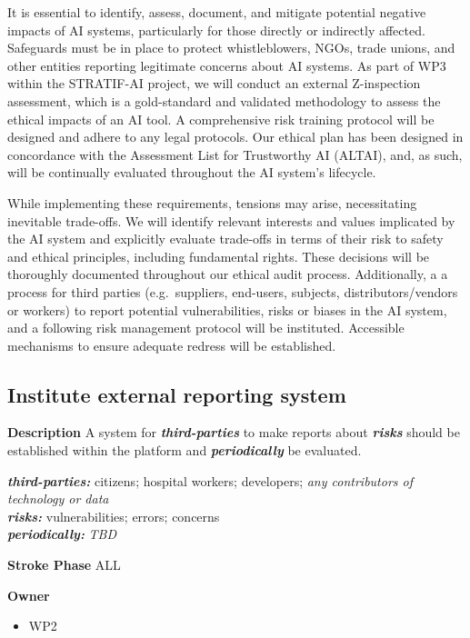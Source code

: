 \documentclass[
  letterpaper,
  DIV=11,
  numbers=noendperiod]{scrreport}
\providecommand{\tightlist}{%
  \setlength{\itemsep}{0pt}\setlength{\parskip}{0pt}}\usepackage{longtable,booktabs,array}
\begin{document}
It is essential to identify, assess, document, and mitigate potential
negative impacts of AI systems, particularly for those directly or
indirectly affected. Safeguards must be in place to protect
whistleblowers, NGOs, trade unions, and other entities reporting
legitimate concerns about AI systems. As part of WP3 within the
STRATIF-AI project, we will conduct an external Z-inspection assessment,
which is a gold-standard and validated methodology to assess the ethical
impacts of an AI tool. A comprehensive risk training protocol will be
designed and adhere to any legal protocols. Our ethical plan has been
designed in concordance with the Assessment List for Trustworthy AI
(ALTAI), and, as such, will be continually evaluated throughout the AI
system's lifecycle.

While implementing these requirements, tensions may arise, necessitating
inevitable trade-offs. We will identify relevant interests and values
implicated by the AI system and explicitly evaluate trade-offs in terms
of their risk to safety and ethical principles, including fundamental
rights. These decisions will be thoroughly documented throughout our
ethical audit process. Additionally, a a process for third parties
(e.g.~suppliers, end-users, subjects, distributors/vendors or workers)
to report potential vulnerabilities, risks or biases in the AI system,
and a following risk management protocol will be instituted. Accessible
mechanisms to ensure adequate redress will be established.

\hypertarget{institute-external-reporting-system}{%
\subsection{Institute external reporting
system}\label{institute-external-reporting-system}}

\textbf{Description} A system for \textbf{\emph{third-parties}} to make
reports about \textbf{\emph{risks}} should be established within the
platform and \textbf{\emph{periodically}} be evaluated.

\textbf{\emph{third-parties:}} citizens; hospital workers; developers;
\emph{any contributors of technology or data}\\
\textbf{\emph{risks:}} vulnerabilities; errors; concerns\\
\textbf{\emph{periodically:}} \emph{TBD}

\textbf{Stroke Phase} ALL

\textbf{Owner}

\begin{itemize}
\tightlist
\item
  WP2
\end{itemize}
\end{document}
